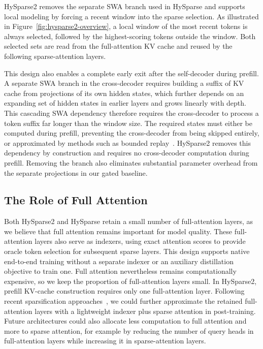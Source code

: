HySparse2 removes the separate SWA branch used in HySparse and supports local modeling by forcing a recent window into the sparse selection.
As illustrated in Figure~\ref{fig:hysparse2-overview}, a local window of the most recent tokens is always selected, followed by the highest-scoring tokens outside the window.
Both selected sets are read from the full-attention KV cache and reused by the following sparse-attention layers.

This design also enables a complete early exit after the self-decoder during prefill. A separate SWA branch in the cross-decoder requires building a suffix of KV cache from projections of its own hidden states, which further depends on an expanding set of hidden states in earlier layers and grows linearly with depth. This cascading SWA dependency therefore requires the cross-decoder to process a token suffix far longer than the window size. The required states must either be computed during prefill, preventing the cross-decoder from being skipped entirely, or approximated by methods such as bounded replay~\citep{deepseekv41flash}. HySparse2 removes this dependency by construction and requires no cross-decoder computation during prefill. Removing the branch also eliminates substantial parameter overhead from the separate projections in our gated baseline.

\subsection{The Role of Full Attention}
Both HySparse2 and HySparse retain a small number of full-attention layers, as we believe that full attention remains important for model quality. 
These full-attention layers also serve as indexers, using exact attention scores to provide oracle token selection for subsequent sparse layers.
This design supports native end-to-end training without a separate indexer or an auxiliary distillation objective to train one.
Full attention nevertheless remains computationally expensive, so we keep the proportion of full-attention layers small. In HySparse2, prefill KV-cache construction requires only one full-attention layer. Following recent sparsification approaches~\citetext{\citealp{seerattn_v1}; \citealp{dsa}}, we could further approximate the retained full-attention layers with a lightweight indexer plus sparse attention in post-training.
Future architectures could also allocate less computation to full attention and more to sparse attention, for example by reducing the number of query heads in full-attention layers while increasing it in sparse-attention layers.


